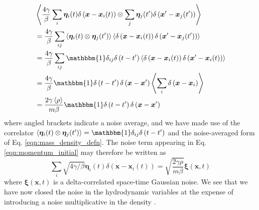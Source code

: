 \documentclass[%
 reprint,
superscriptaddress,
longbibliography,
 amsmath,amssymb,
 prl,
 citeautoscript,
]{revtex4-1}
\begin{document}
\[
\begin{split}
&\left\langle \frac{4 \gamma}{\beta} \sum_i {\boldsymbol \eta}_i(t) \delta \left( {\boldsymbol x} - {\boldsymbol x}_i (t) \right) \otimes \sum_j {\boldsymbol \eta}_j (t') \delta \left( {\boldsymbol x}' - {\boldsymbol x}_j (t') \right) \right\rangle \\
&= \frac{4 \gamma}{\beta} \sum_{ij} \left\langle {\boldsymbol \eta}_i(t) \otimes {\boldsymbol \eta}_j(t') \right\rangle \left\langle \delta \left( {\boldsymbol x} - {\boldsymbol x}_i(t) \right) \delta \left( {\boldsymbol x}' - {\boldsymbol x}_j(t') \right) \right\rangle \\
&= \frac{4 \gamma}{\beta} \sum_{ij} \mathbbm{1} \delta_{ij} \delta \left( t - t' \right) \left\langle \delta \left( {\boldsymbol x} - {\boldsymbol x}_i(t) \right) \delta \left( {\boldsymbol x}' - {\boldsymbol x}_i(t) \right) \right\rangle \\
&= \frac{4 \gamma}{\beta} \mathbbm{1} \delta \left( t - t' \right) \delta \left( {\boldsymbol x} - {\boldsymbol x}' \right) \left\langle \sum_i \delta \left( {\boldsymbol x} - {\boldsymbol x}_i \right) \right\rangle \\
&= \frac{2 \gamma \left\langle \rho \right\rangle}{m \beta} \mathbbm{1} \delta \left( t - t' \right) \delta \left( {\boldsymbol x} - {\boldsymbol x}' \right)
\end{split}
\label{eqn:second_cumulant}
\]
where angled brackets indicate a noise average, and we have made use of the correlator $\left\langle {\boldsymbol \eta}_i (t) \otimes {\boldsymbol \eta}_j (t') \right\rangle = \mathbbm{1} \delta_{ij} \delta \left( t - t' \right)$ and the noise-averaged form of Eq. \ref{eqn:mass_density_defn}. The noise term appearing in Eq. \ref{eqn:momentum_initial} may therefore be written as
\begin{equation}
\sum_i \sqrt{4 \gamma / \beta} {\boldsymbol \eta}_i(t) \delta \left( {\boldsymbol x} - {\boldsymbol x}_i(t) \right) = \sqrt{ \frac{2 \gamma \rho}{m \beta} } {\boldsymbol \xi} \left( {\boldsymbol x}, t \right)
\label{eqn:noise_momentum_eqn}
\end{equation}
where ${\boldsymbol \xi} \left( {\boldsymbol x}, t \right)$ is a delta-correlated space-time Gaussian noise. We see that we have now closed the noise in the hydrodynamic variables at the expense of introducing a noise multiplicative in the density \cite{dean}.
\end{document}
